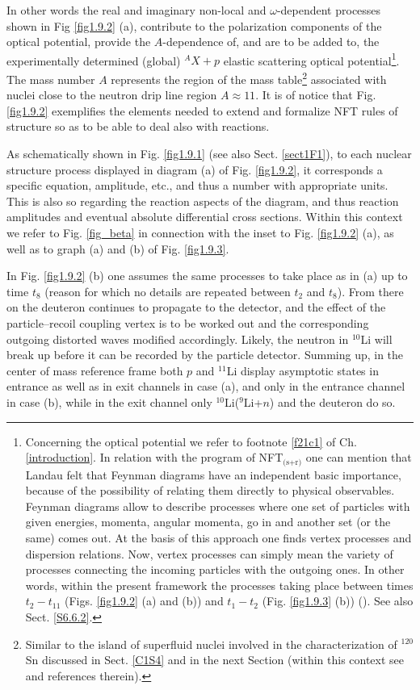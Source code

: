 In other words the real and imaginary non-local and $\omega$-dependent processes  shown in Fig \ref{fig1.9.2} (a), contribute to the  polarization components of the optical potential, provide the $A$-dependence of, and are to be added to, the experimentally determined (global) $^AX+p$ elastic scattering optical potential\footnote{Concerning the optical potential we refer to footnote \ref{f21c1} of Ch. \ref{introduction}. In relation with the program of NFT$_{\text{(s+r)}}$ one can mention that Landau felt that  Feynman diagrams have an independent basic importance, because of the possibility of relating them directly to physical observables. Feynman diagrams allow to describe processes where one set of particles with given energies, momenta, angular momenta, go in and another set (or the same) comes out. At the basis of this approach one finds vertex processes and dispersion relations. Now, vertex processes can simply mean the variety of processes connecting the incoming particles with the outgoing ones. In other words, within the present framework the processes taking place between times $t_2-t_{11}$ (Figs. \ref{fig1.9.2} (a) and (b)) and $t_1-t_2$ (Fig. \ref{fig1.9.3} (b)) (\cite{Landau:59,terHaar:69}). See also Sect. \ref{S6.6.2}.}. The mass number $A$ represents the region of the mass table\footnote{Similar to the island of superfluid nuclei involved in the characterization of $^{120}$Sn discussed in  Sect. \ref{C1S4} and in the next Section (within this context see \cite{Idini:15} and references therein).} associated with nuclei close to the neutron  drip line region $A\approx11$.
  It is of
notice that Fig. \ref{fig1.9.2} exemplifies  the elements needed to extend and formalize NFT rules of
structure so as to be able to deal also with reactions.

As schematically shown in Fig. \ref{fig1.9.1} (see also Sect. \ref{sect1F1}), to each nuclear structure process displayed in diagram (a) of Fig. \ref{fig1.9.2}, it corresponds a specific equation, amplitude, etc., and thus a number with appropriate units. This is also so regarding the reaction aspects of the diagram, and thus reaction amplitudes and eventual absolute differential cross sections.
Within this context we refer to Fig. \ref{fig_beta} in connection with the inset to Fig. \ref{fig1.9.2} (a), as well as to graph (a) and (b) of Fig. \ref{fig1.9.3}.


 In Fig. \ref{fig1.9.2} (b) one assumes the same processes to take place  as in (a) up to time $t_8$ (reason for which no details
are repeated between $t_2$ and $t_8$). From there on the deuteron continues to propagate to
the detector, and the effect of the particle--recoil coupling vertex is to be worked out and the corresponding outgoing distorted waves modified accordingly. Likely, the neutron in $^{10}$Li will break up
before it can be recorded by the particle detector. Summing up, in the center of mass reference frame both $p$ and $^{11}$Li
display asymptotic states in entrance as well as in exit channels in case (a), and only
in the entrance channel in case (b), while in the exit channel only $^{10}$Li($^9$Li+$n$) and the
deuteron do so. 

